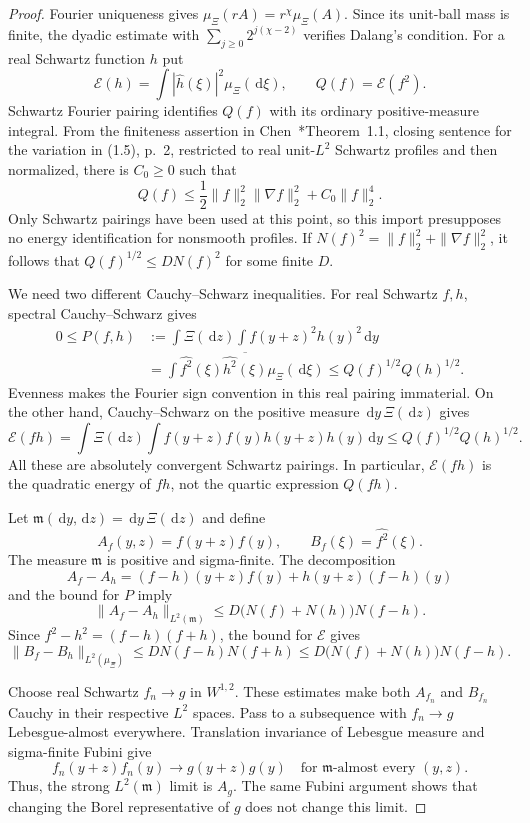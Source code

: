 \documentclass[12pt]{article}
\numberwithin{equation}{section}
\theoremstyle{definition}
\newcommand{\ud}{\,\mathrm{d}}
\begin{document}
\begin{proof}
  Fourier uniqueness gives
  $\mu_\Xi(rA)=r^\chi\mu_\Xi(A)$.
  Since its unit-ball mass is finite, the dyadic estimate with
  $\sum_{j\ge0}2^{j(\chi-2)}$ verifies Dalang's condition.
  For a real Schwartz function $h$ put
  \[
    \mathscr E(h)=\int|\widehat h(\xi)|^2\mu_\Xi(\ud\xi),
    \qquad Q(f)=\mathscr E(f^2).
  \]
  Schwartz Fourier pairing identifies $Q(f)$ with its ordinary
  positive-measure integral. From the finiteness assertion in
  Chen~\cite{chen:23:exponential}*{Theorem~1.1, closing sentence
  for the variation in (1.5), p.~2},
  restricted to real unit-$L^2$ Schwartz profiles and then normalized,
  there is $C_0\ge0$ such that
  \[
    Q(f)\le\frac12\|f\|_2^2\|\nabla f\|_2^2+C_0\|f\|_2^4.
  \]
  Only Schwartz pairings have been used at this point, so this import
  presupposes no energy identification for nonsmooth profiles.
  If $N(f)^2=\|f\|_2^2+\|\nabla f\|_2^2$, it follows that
  $Q(f)^{1/2}\le D N(f)^2$ for some finite $D$.

  We need two different Cauchy--Schwarz inequalities.
  For real Schwartz $f,h$, spectral Cauchy--Schwarz gives
  \[
    \begin{split}
      0\le P(f,h)
      &:=\int\Xi(\ud z)\int f(y+z)^2h(y)^2\ud y\\
      &=\int\widehat{f^2}(\xi)
      \overline{\widehat{h^2}(\xi)}\mu_\Xi(\ud\xi)
      \le Q(f)^{1/2}Q(h)^{1/2}.
    \end{split}
  \]
  Evenness makes the Fourier sign convention in this real pairing
  immaterial. On the other hand, Cauchy--Schwarz on the positive
  measure $\ud y\,\Xi(\ud z)$ gives
  \[
    \mathscr E(fh)
    =\int\Xi(\ud z)\int
    f(y+z)f(y)h(y+z)h(y)\ud y
    \le Q(f)^{1/2}Q(h)^{1/2}.
  \]
  All these are absolutely convergent Schwartz pairings.
  In particular, $\mathscr E(fh)$ is the quadratic energy of $fh$,
  not the quartic expression $Q(fh)$.

  Let $\mathfrak m(\ud y,\ud z)=\ud y\,\Xi(\ud z)$ and define
  \[
    A_f(y,z)=f(y+z)f(y),\qquad B_f(\xi)=\widehat{f^2}(\xi).
  \]
  The measure $\mathfrak m$ is positive and sigma-finite.
  The decomposition
  \[
    A_f-A_h=(f-h)(y+z)f(y)+h(y+z)(f-h)(y)
  \]
  and the bound for $P$ imply
  \[
    \|A_f-A_h\|_{L^2(\mathfrak m)}
    \le D\bigl(N(f)+N(h)\bigr)N(f-h).
  \]
  Since $f^2-h^2=(f-h)(f+h)$, the bound for $\mathscr E$ gives
  \[
    \|B_f-B_h\|_{L^2(\mu_\Xi)}
    \le D N(f-h)N(f+h)
    \le D\bigl(N(f)+N(h)\bigr)N(f-h).
  \]

  Choose real Schwartz $f_n\to g$ in $W^{1,2}$.
  These estimates make both $A_{f_n}$ and $B_{f_n}$ Cauchy in
  their respective $L^2$ spaces. Pass to a subsequence with
  $f_n\to g$ Lebesgue-almost everywhere.
  Translation invariance of Lebesgue measure and sigma-finite Fubini give
  \[
    f_n(y+z)f_n(y)\longrightarrow g(y+z)g(y)
    \quad\text{for }\mathfrak m\text{-almost every }(y,z).
  \]
  Thus, the strong $L^2(\mathfrak m)$ limit is $A_g$.
  The same Fubini argument shows that changing the Borel
  representative of $g$ does not change this limit.


\end{proof}
\end{document}
